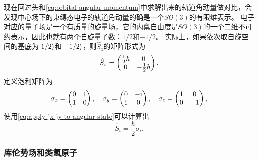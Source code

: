 \documentclass[UTF8, a4paper]{ctexart}
\newcommand*{\ii}{\mathrm{i}}
\begin{document}
现在回过头和\eqref{eq:orbital-angular-momentum}中求解出来的轨道角动量做对比，会发现中心场下的束缚态电子的轨道角动量的确是一个$SO(3)$的有限维表示。
电子对应的量子场是一个有质量的旋量场，它的内禀自由度是$SO(3)$的一个二维不可约表示，因此也就有两个自旋量子数：$1/2$和$-1/2$。
实际上，如果依次取自旋空间的基底为$\ket{1/2}$和$\ket{-1/2}$，则$\hat{S}_z$的矩阵形式为
\[
    \hat{S}_z = \pmqty{\frac{1}{2} \hbar & 0 \\ 0 & -\frac{1}{2} \hbar}.
\]
定义泡利矩阵为
\begin{equation}
    \sigma_x = \pmqty{0 & 1 \\ 1 & 0}, \quad \sigma_y = \pmqty{0 & -\ii \\ \ii & 0}, \quad \sigma_z = \pmqty{1 & 0 \\ 0 & -1},
\end{equation}
使用\eqref{eq:apply-jx-jy-to-angular-state}可以计算出
\begin{equation}
    \hat{S}_i = \frac{\hbar}{2} \sigma_i.
\end{equation}

\subsubsection{库伦势场和类氢原子}
\end{document}
